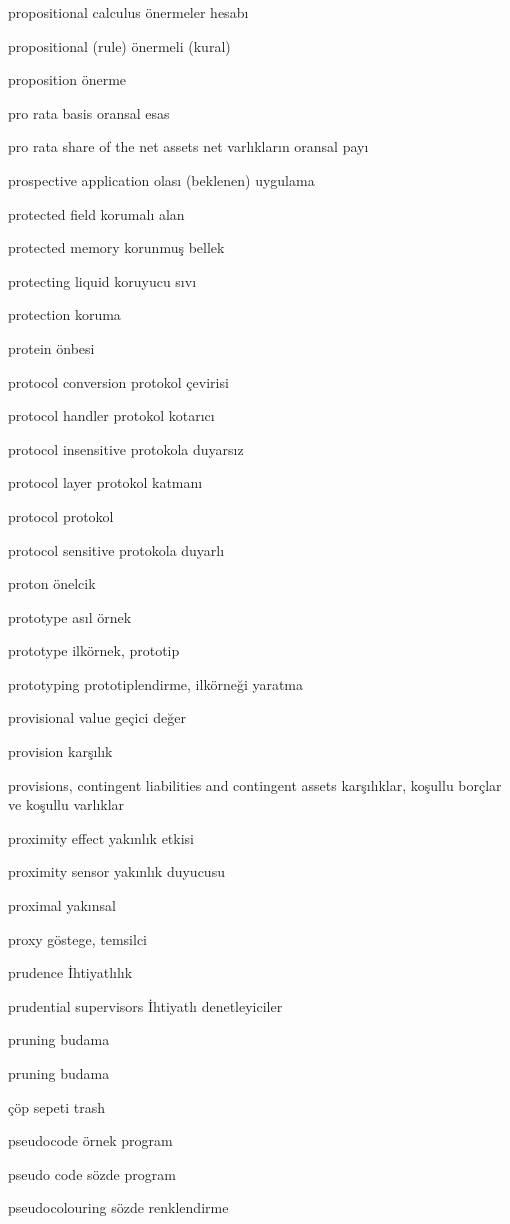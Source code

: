 \documentclass[12pt,fleqn]{article}\usepackage{../../common}
\begin{document}
propositional calculus önermeler hesabı

propositional (rule) önermeli (kural)

proposition önerme

pro rata basis oransal esas

pro rata share of the net assets net varlıkların oransal payı

prospective application olası (beklenen) uygulama

protected field korumalı alan

protected memory korunmuş bellek

protecting liquid koruyucu sıvı

protection koruma

protein önbesi

protocol conversion protokol çevirisi

protocol handler protokol kotarıcı

protocol insensitive protokola duyarsız

protocol layer protokol katmanı

protocol protokol

protocol sensitive protokola duyarlı

proton önelcik

prototype asıl örnek

prototype ilkörnek, prototip

prototyping prototiplendirme, ilkörneği yaratma

provisional value geçici değer

provision karşılık

provisions, contingent liabilities and contingent assets karşılıklar, koşullu borçlar ve koşullu varlıklar

proximity effect yakınlık etkisi

proximity sensor yakınlık duyucusu

proximal yakınsal

proxy göstege, temsilci

prudence İhtiyatlılık

prudential supervisors İhtiyatlı denetleyiciler

pruning budama

pruning budama

çöp sepeti trash

pseudocode örnek program

pseudo code sözde program

pseudocolouring sözde renklendirme
\end{document}
